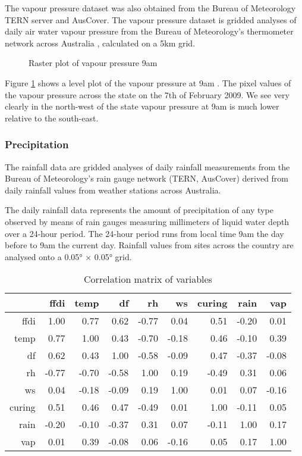 \documentclass[11pt,a4paper]{article}
\begin{document}
The vapour pressure dataset was also obtained from the Bureau of Meteorology TERN server and AusCover. The vapour pressure dataset is gridded analyses of daily air water vapour pressure from the Bureau of Meteorology's thermometer network across Australia \citep{jones09}, calculated on a 5km grid. 

\begin{figure}[h]
	\centering 
	\caption{Raster plot of vapour pressure 9am } 
	\label{fig:vap_ras} 
\end{figure}

Figure \ref{fig:vap_ras} shows a level plot of the vapour pressure at 9am \citep{rastervis}. The pixel values of the vapour pressure across the state on the 7th of February 2009. We see very clearly in the north-west of the state vapour pressure at 9am is much lower relative to the south-east. 


\subsubsection{Precipitation}

The rainfall data are gridded analyses of daily rainfall measurements from the Bureau of Meteorology's rain gauge network (TERN, AusCover) derived from daily rainfall values from weather stations across Australia. 

The daily rainfall data represents the amount of precipitation of any type observed by means of rain gauges measuring millimeters of liquid water depth over a 24-hour period. The 24-hour period runs from local time 9am the day before to 9am the current day. Rainfall values from sites across the country are analysed onto a 0.05° × 0.05° grid.

\begin{table}[ht]
	\centering
	\begin{tabular}{rrrrrrrrr}
		\hline
		& ffdi & temp & df & rh & ws & curing & rain & vap \\ 
		\hline
		ffdi & 1.00 & 0.77 & 0.62 & -0.77 & 0.04 & 0.51 & -0.20 & 0.01 \\ 
		temp & 0.77 & 1.00 & 0.43 & -0.70 & -0.18 & 0.46 & -0.10 & 0.39 \\ 
		df & 0.62 & 0.43 & 1.00 & -0.58 & -0.09 & 0.47 & -0.37 & -0.08 \\ 
		rh & -0.77 & -0.70 & -0.58 & 1.00 & 0.19 & -0.49 & 0.31 & 0.06 \\ 
		ws & 0.04 & -0.18 & -0.09 & 0.19 & 1.00 & 0.01 & 0.07 & -0.16 \\ 
		curing & 0.51 & 0.46 & 0.47 & -0.49 & 0.01 & 1.00 & -0.11 & 0.05 \\ 
		rain & -0.20 & -0.10 & -0.37 & 0.31 & 0.07 & -0.11 & 1.00 & 0.17 \\ 
		vap & 0.01 & 0.39 & -0.08 & 0.06 & -0.16 & 0.05 & 0.17 & 1.00 \\ 
		\hline
	\end{tabular}
	\caption{Correlation matrix of variables}
	\label{table:correl}
\end{table}
\end{document}
